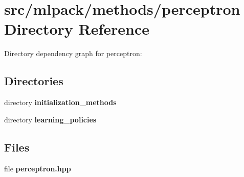 \section{src/mlpack/methods/perceptron Directory Reference}
\label{dir_d1be4479dffdf1b9f98978aa2d42ca89}
Directory dependency graph for perceptron\-:
\subsection*{Directories}
\begin{DoxyCompactItemize}
\item 
directory {\bf initialization\-\_\-methods}
\item 
directory {\bf learning\-\_\-policies}
\end{DoxyCompactItemize}
\subsection*{Files}
\begin{DoxyCompactItemize}
\item 
file {\bf perceptron.\-hpp}
\end{DoxyCompactItemize}
